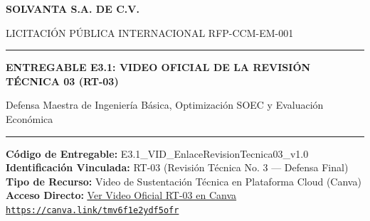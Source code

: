 \documentclass[11pt,letterpaper]{article}
\begin{document}
\begin{center}
    {\Huge\bfseries\color{solvantaBlue} SOLVANTA S.A. DE C.V.\par}
    \vspace{0.4cm}
    {\large\color{gray} LICITACI\'ON P\'UBLICA INTERNACIONAL RFP-CCM-EM-001\par}
    \vspace{0.8cm}
    \rule{\linewidth}{1.5pt}\par
    \vspace{0.8cm}
    {\LARGE\bfseries ENTREGABLE E3.1: VIDEO OFICIAL DE LA REVISI\'ON T\'ECNICA 03 (RT-03)\par}
    \vspace{0.3cm}
    {\large Defensa Maestra de Ingenier\'ia B\'asica, Optimizaci\'on SOEC y Evaluaci\'on Econ\'omica\par}
    \vspace{0.8cm}
    \rule{\linewidth}{1.5pt}\par
    \vspace{1.3cm}

    \textbf{C\'odigo de Entregable:} E3.1\_VID\_EnlaceRevisionTecnica03\_v1.0\\
    \textbf{Identificaci\'on Vinculada:} RT-03 (Revisi\'on T\'ecnica No. 3 — Defensa Final)\\
    \textbf{Tipo de Recurso:} Video de Sustentaci\'on T\'ecnica en Plataforma Cloud (Canva)\\
    \vspace{0.4cm}
    \textbf{Acceso Directo:} \href{https://canva.link/tmv6f1e2ydf5ofr}{\color{solvantaAccent}\underline{\Large Ver Video Oficial RT-03 en Canva}}\\
    \vspace{0.4cm}
    \texttt{\url{https://canva.link/tmv6f1e2ydf5ofr}}
    \vspace{1.5cm}


\end{center}
\end{document}
